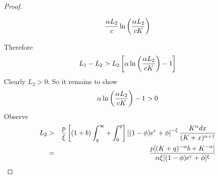 \documentclass{article}
\begin{document}
\begin{proof}
\begin{enumerate}[i.]
\[      {\alpha L_2  \over c}
      \ln\left(
      {\alpha L_2  \over c K}
      \right)
    \]
  \end{enumerate}
  Therefore
  \[
  L_1 - L_2 > L_2 \left[
    \alpha \ln \left(
    {\alpha L_2 \over c K}
    \right) - 1
  \right]
  \]
  Clearly $L_2 > 0$. So it remains to show
  \[
    \alpha \ln \left(
    {\alpha L_2 \over c K}
    \right) - 1 > 0
  \]
  Observe
  \begin{eqnarray*}
    L_2 &>&
      {p \over \xi}
      \left[
      (1 + b)\int_{q}^{\infty} +
      \int_{0}^q
      \right]
      \left[
        (1 - \phi) e^r + \phi
      \right]^{-\xi}
      {K^{\alpha} dx
        \over
        (K + x)^{\alpha + 1}
      } \\
      &=& {
        p [(K + q)^{-\alpha} b + K^{-\alpha}]
        \over
        \alpha \xi [(1 - \phi) e^r + \phi]^\xi
      } 
  \end{eqnarray*}
\end{proof}

\end{document}
